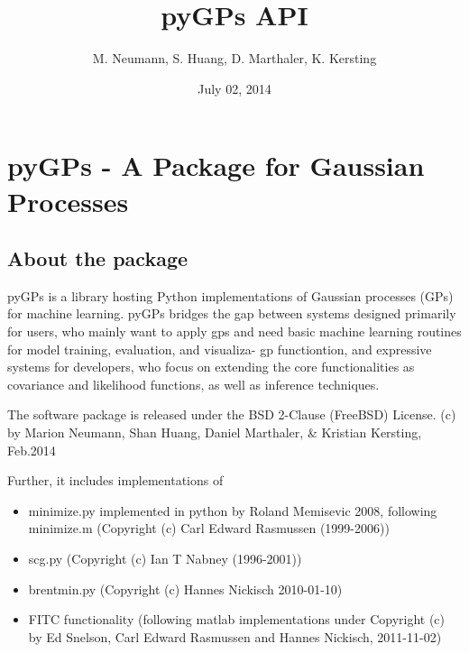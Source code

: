 \documentclass[letterpaper,10pt,english]{sphinxmanual}
\title{pyGPs API}
\date{July 02, 2014}
\author{M. Neumann, S. Huang, D. Marthaler, K. Kersting}
\begin{document}
\maketitle
\tableofcontents
{}\label{index::doc}



\chapter{pyGPs - A Package for Gaussian Processes}
\label{index:pygps-a-package-for-gaussian-processes}\label{index:welcome-to-pygps-s-api}

\section{About the package}
\label{index:about-the-package}
pyGPs is a library hosting Python implementations of Gaussian processes (GPs) for
machine learning.
pyGPs bridges the gap between systems designed primarily for users, who mainly
want to apply gps and need basic machine learning routines for model training, evaluation, and visualiza-
gp functiontion, and expressive systems for developers, who focus on extending the core
functionalities as covariance and likelihood functions, as well as inference techniques.

The software package is released under the BSD 2-Clause (FreeBSD) License.
 (c) by
Marion Neumann, Shan Huang, Daniel Marthaler, \& Kristian Kersting, Feb.2014

Further, it includes implementations of
\begin{itemize}
\item {} 
minimize.py implemented in python by Roland Memisevic 2008, following minimize.m (Copyright (c) Carl Edward Rasmussen (1999-2006))

\item {} 
scg.py (Copyright (c) Ian T Nabney (1996-2001))

\item {} 
brentmin.py (Copyright (c) Hannes Nickisch 2010-01-10)

\item {} 
FITC functionality (following matlab implementations under Copyright (c) by Ed Snelson, Carl Edward Rasmussen and Hannes Nickisch, 2011-11-02)

\end{itemize}
\end{document}
